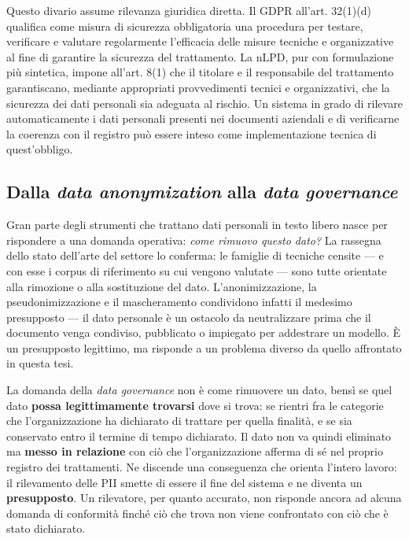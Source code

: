 Questo divario assume rilevanza giuridica diretta. Il GDPR all’art. 32(1)(d) qualifica come misura di sicurezza obbligatoria una procedura per testare, verificare e valutare regolarmente l’efficacia delle misure tecniche e organizzative al fine di garantire la sicurezza del trattamento. La nLPD, pur con formulazione più sintetica, impone all’art. 8(1) che il titolare e il responsabile del trattamento garantiscano, mediante appropriati provvedimenti tecnici e organizzativi, che la sicurezza dei dati personali sia adeguata al rischio. Un sistema in grado di rilevare automaticamente i dati personali presenti nei documenti aziendali e di verificarne la coerenza con il registro può essere inteso come implementazione tecnica di quest’obbligo.

\subsection{Dalla \textit{data anonymization} alla \textit{data governance}}
\label{sub:anonymization-governance}
Gran parte degli strumenti che trattano dati personali in testo libero nasce per rispondere a una domanda operativa: \emph{come rimuovo questo dato?} La rassegna dello stato dell'arte del settore \cite{lisonAnonymisationModelsText2021} lo conferma: le famiglie di tecniche censite --- e con esse i corpus di riferimento su cui vengono valutate \cite{pilanTextAnonymizationBenchmark2022} --- sono tutte orientate alla rimozione o alla sostituzione del dato. L'anonimizzazione, la pseudonimizzazione e il mascheramento condividono infatti il medesimo presupposto --- il dato personale è un ostacolo da neutralizzare prima che il documento venga condiviso, pubblicato o impiegato per addestrare un modello. È un presupposto legittimo, ma risponde a un problema diverso da quello affrontato in questa tesi. \medskip

La domanda della \textit{data governance} \cite{abrahamDataGovernanceConceptual2019} non è come rimuovere un dato, bensì se quel dato \textbf{possa legittimamente trovarsi} dove si trova: se rientri fra le categorie che l'organizzazione ha dichiarato di trattare per quella finalità, e se sia conservato entro il termine di tempo dichiarato. Il dato non va quindi eliminato ma \textbf{messo in relazione} con ciò che l'organizzazione afferma di sé nel proprio registro dei trattamenti. Ne discende una conseguenza che orienta l'intero lavoro: il rilevamento delle PII smette di essere il fine del sistema e ne diventa un \textbf{presupposto}. Un rilevatore, per quanto accurato, non risponde ancora ad alcuna domanda di conformità finché ciò che trova non viene confrontato con ciò che è stato dichiarato.


